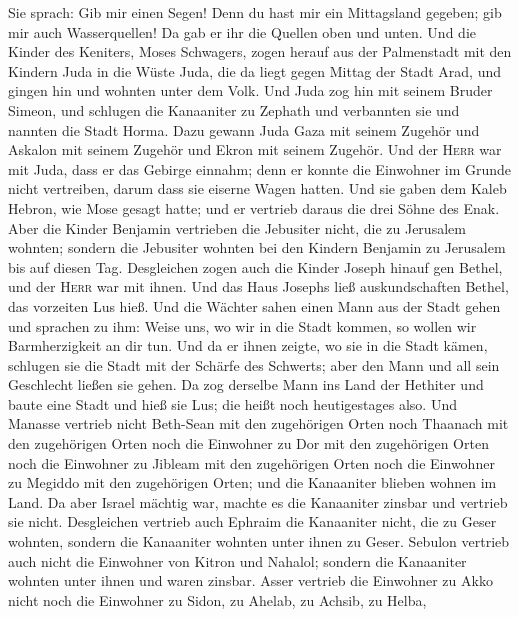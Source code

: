  Sie sprach: Gib mir einen Segen! Denn du hast mir ein
Mittagsland gegeben; gib mir auch Wasserquellen! Da gab er ihr die
Quellen oben und unten.  Und die Kinder des Keniters,
Moses Schwagers, zogen herauf aus der Palmenstadt mit den Kindern Juda
in die Wüste Juda, die da liegt gegen Mittag der Stadt Arad, und gingen
hin und wohnten unter dem Volk.  Und Juda zog hin mit
seinem Bruder Simeon, und schlugen die Kanaaniter zu Zephath und
verbannten sie und nannten die Stadt Horma.  Dazu gewann
Juda Gaza mit seinem Zugehör und Askalon mit seinem Zugehör und Ekron
mit seinem Zugehör.  Und der \textsc{Herr} war mit Juda,
dass er das Gebirge einnahm; denn er konnte die Einwohner im Grunde
nicht vertreiben, darum dass sie eiserne Wagen hatten. 
Und sie gaben dem Kaleb Hebron, wie Mose gesagt hatte; und er vertrieb
daraus die drei Söhne des Enak.  Aber die Kinder Benjamin
vertrieben die Jebusiter nicht, die zu Jerusalem wohnten; sondern die
Jebusiter wohnten bei den Kindern Benjamin zu Jerusalem bis auf diesen
Tag.  Desgleichen zogen auch die Kinder Joseph hinauf gen
Bethel, und der \textsc{Herr} war mit ihnen.  Und das
Haus Josephs ließ auskundschaften Bethel, das vorzeiten Lus hieß.
 Und die Wächter sahen einen Mann aus der Stadt gehen und
sprachen zu ihm: Weise uns, wo wir in die Stadt kommen, so wollen wir
Barmherzigkeit an dir tun.  Und da er ihnen zeigte, wo
sie in die Stadt kämen, schlugen sie die Stadt mit der Schärfe des
Schwerts; aber den Mann und all sein Geschlecht ließen sie gehen.
 Da zog derselbe Mann ins Land der Hethiter und baute
eine Stadt und hieß sie Lus; die heißt noch heutigestages also.
 Und Manasse vertrieb nicht Beth-Sean mit den zugehörigen
Orten noch Thaanach mit den zugehörigen Orten noch die Einwohner zu Dor
mit den zugehörigen Orten noch die Einwohner zu Jibleam mit den
zugehörigen Orten noch die Einwohner zu Megiddo mit den zugehörigen
Orten; und die Kanaaniter blieben wohnen im Land.  Da
aber Israel mächtig war, machte es die Kanaaniter zinsbar und vertrieb
sie nicht.  Desgleichen vertrieb auch Ephraim die
Kanaaniter nicht, die zu Geser wohnten, sondern die Kanaaniter wohnten
unter ihnen zu Geser.  Sebulon vertrieb auch nicht die
Einwohner von Kitron und Nahalol; sondern die Kanaaniter wohnten unter
ihnen und waren zinsbar.  Asser vertrieb die Einwohner zu
Akko nicht noch die Einwohner zu Sidon, zu Ahelab, zu Achsib, zu Helba,
